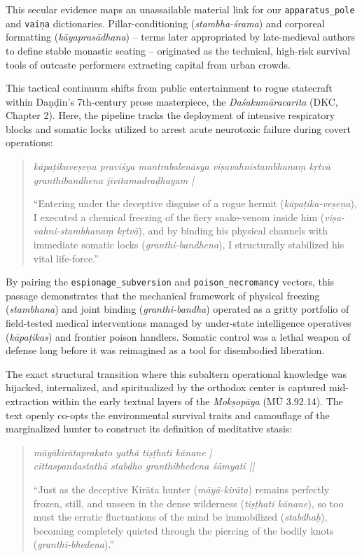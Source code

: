 \documentclass[11pt,twoside,letterpaper]{article}
\begin{document}
This secular evidence maps an unassailable material link for our \texttt{apparatus\_pole} and \texttt{vaiṇa} dictionaries. Pillar-conditioning (\textit{stambha-śrama}) and corporeal formatting (\textit{kāyaprasādhana}) -- terms later appropriated by late-medieval authors to define stable monastic seating -- originated as the technical, high-risk survival tools of outcaste performers extracting capital from urban crowds.

This tactical continuum shifts from public entertainment to rogue statecraft within Daṇḍin's 7th-century prose masterpiece, the \textit{Daśakumāracarita} (DKC, Chapter 2). Here, the pipeline tracks the deployment of intensive respiratory blocks and somatic locks utilized to arrest acute neurotoxic failure during covert operations:

\begin{quote}
\small
\textit{kāpaṭikaveṣeṇa praviśya mantrabalenāsya viṣavahnistambhanaṃ kṛtvā granthibandhena jīvitamadraḍhayam |}
\medskip

``Entering under the deceptive disguise of a rogue hermit (\textit{kāpaṭika-veṣeṇa}), I executed a chemical freezing of the fiery snake-venom inside him (\textit{viṣa-vahni-stambhanaṃ kṛtvā}), and by binding his physical channels with immediate somatic locks (\textit{granthi-bandhena}), I structurally stabilized his vital life-force.''
\end{quote}

By pairing the \texttt{espionage\_subversion} and \texttt{poison\_necromancy} vectors, this passage demonstrates that the mechanical framework of physical freezing (\textit{stambhana}) and joint binding (\textit{granthi-bandha}) operated as a gritty portfolio of field-tested medical interventions managed by under-state intelligence operatives (\textit{kāpaṭikas}) and frontier poison handlers. Somatic control was a lethal weapon of defense long before it was reimagined as a tool for disembodied liberation.

The exact structural transition where this subaltern operational knowledge was hijacked, internalized, and spiritualized by the orthodox center is captured mid-extraction within the early textual layers of the \textit{Mokṣopāya} (MŪ 3.92.14). The text openly co-opts the environmental survival traits and camouflage of the marginalized hunter to construct its definition of meditative stasis:

\begin{quote}
\small
\textit{māyākirātaprakato yathā tiṣṭhati kānane | \\
cittaspandastathā stabdho granthibhedena śāmyati ||}
\medskip

``Just as the deceptive Kirāta hunter (\textit{māyā-kirāta}) remains perfectly frozen, still, and unseen in the dense wilderness (\textit{tiṣṭhati kānane}), so too must the erratic fluctuations of the mind be immobilized (\textit{stabdhaḥ}), becoming completely quieted through the piercing of the bodily knots (\textit{granthi-bhedena}).''
\end{quote}
\end{document}
